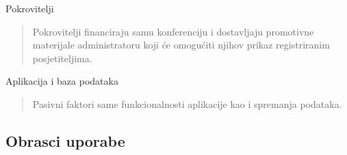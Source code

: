 \begin{packed_enum}
				\item Pokrovitelji
				\begin{quote}
					Pokrovitelji financiraju samu konferenciju i dostavljaju promotivne materijale administratoru koji će omogućiti njihov prikaz registriranim posjetiteljima.
				\end{quote}


				\item Aplikacija i baza podataka
				\begin{quote}
					Pasivni faktori same funkcionalnosti aplikacije kao i spremanja podataka.
				\end{quote}
			\end{packed_enum}

			\eject



			\subsection{Obrasci uporabe}

